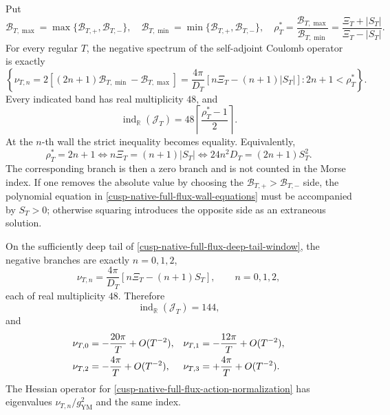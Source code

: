 \begin{theorem}
\label{cusp-native-full-flux-Morse-theorem}
Put
\begin{equation}
 \mathcal B_{T,\max}=\max\{\mathcal B_{T,+},\mathcal B_{T,-}\},
 \quad
 \mathcal B_{T,\min}=\min\{\mathcal B_{T,+},\mathcal B_{T,-}\},
 \quad
 \rho_T^*=\frac{\mathcal B_{T,\max}}{\mathcal B_{T,\min}}
 =\frac{\Xi_T+|S_T|}{\Xi_T-|S_T|}.
 \label{cusp-native-full-flux-ordered-ratio}
\end{equation}
For every regular \(T\), the negative spectrum of the self-adjoint Coulomb
operator is exactly
\begin{equation}
 \left\{
 \nu_{T,n}=2[(2n+1)\mathcal B_{T,\min}-\mathcal B_{T,\max}]
 =\frac{4\pi}{D_T}[n\Xi_T-(n+1)|S_T|]:
 2n+1<\rho_T^*
 \right\}.
 \label{cusp-native-full-flux-general-negative-spectrum}
\end{equation}
Every indicated band has real multiplicity \(48\), and
\begin{equation}
 \operatorname{ind}_{\mathbb R}(\mathcal J_T)
 =48\left\lceil\frac{\rho_T^*-1}{2}\right\rceil.
 \label{cusp-native-full-flux-general-index}
\end{equation}
At the \(n\)-th wall the strict inequality becomes equality.  Equivalently,
\begin{equation}
 \rho_T^*=2n+1
 \iff n\Xi_T=(n+1)|S_T|
 \iff 24n^2D_T=(2n+1)S_T^2.
 \label{cusp-native-full-flux-wall-equations}
\end{equation}
The corresponding branch is then a zero branch and is not counted in the
Morse index.  If one removes the absolute value by choosing the
\(\mathcal B_{T,+}>\mathcal B_{T,-}\) side, the polynomial equation in
\cref{cusp-native-full-flux-wall-equations} must be accompanied by \(S_T>0\);
otherwise squaring introduces the opposite side as an extraneous solution.

On the sufficiently deep tail of
\cref{cusp-native-full-flux-deep-tail-window}, the negative branches are
exactly \(n=0,1,2\),
\begin{equation}
 \nu_{T,n}=\frac{4\pi}{D_T}[n\Xi_T-(n+1)S_T],
 \qquad n=0,1,2,
 \label{cusp-native-full-flux-deep-negative-branches}
\end{equation}
each of real multiplicity \(48\).  Therefore
\begin{equation}
 \operatorname{ind}_{\mathbb R}(\mathcal J_T)=144,
 \label{cusp-native-full-flux-deep-index}
\end{equation}
and
\begin{align}
 \nu_{T,0}&=-\frac{20\pi}{T}+O(T^{-2}),&
 \nu_{T,1}&=-\frac{12\pi}{T}+O(T^{-2}),\notag\\
 \nu_{T,2}&=-\frac{4\pi}{T}+O(T^{-2}),&
 \nu_{T,3}&=+\frac{4\pi}{T}+O(T^{-2}).
 \label{cusp-native-full-flux-negative-asymptotics}
\end{align}
The Hessian operator for
\cref{cusp-native-full-flux-action-normalization} has eigenvalues
\(\nu_{T,n}/g_{\mathrm{YM}}^2\) and the same index.
\end{theorem}

